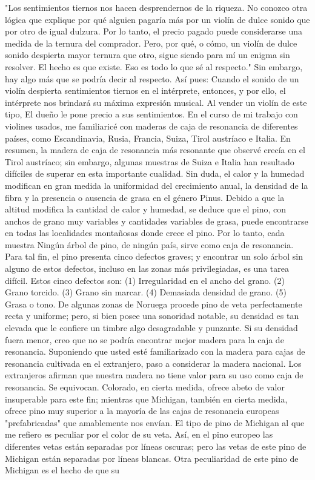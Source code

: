 "Los sentimientos tiernos nos hacen desprendernos de la riqueza. No conozco otra lógica que explique por qué alguien pagaría más por un violín de dulce sonido que por otro de igual dulzura. Por lo tanto, el precio pagado puede considerarse una medida de la ternura del comprador. Pero, por qué, o cómo, un violín de dulce sonido despierta mayor ternura que otro, sigue siendo para mí un enigma sin resolver. El hecho es que existe. Eso es todo lo que sé al respecto."
Sin embargo, hay algo más que se podría decir al respecto. Así pues: Cuando el sonido de un violín despierta sentimientos tiernos en el intérprete, entonces, y por ello, el intérprete nos brindará su máxima expresión musical. Al vender un violín de este tipo,
El dueño le pone precio a sus sentimientos.
En el curso de mi trabajo con violines usados, me familiaricé con maderas de caja de resonancia de diferentes países, como Escandinavia, Rusia, Francia, Suiza, Tirol austríaco e Italia. En resumen, la madera de caja de resonancia más resonante que observé crecía en el Tirol austríaco; sin embargo, algunas muestras de Suiza e Italia han resultado difíciles de superar en esta importante cualidad. Sin duda, el calor y la humedad modifican en gran medida la uniformidad del crecimiento anual, la densidad de la fibra y la presencia o ausencia de grasa en el género Pinus. Debido a que la altitud modifica la cantidad de calor y humedad, se deduce que el pino, con anchos de grano muy variables y cantidades variables de grasa, puede encontrarse en todas las localidades montañosas donde crece el pino. Por lo tanto, cada muestra
Ningún árbol de pino, de ningún país, sirve como caja de resonancia. Para tal fin, el pino presenta cinco defectos graves; y encontrar un solo árbol sin alguno de estos defectos, incluso en las zonas más privilegiadas, es una tarea difícil. Estos cinco defectos son:
(1) Irregularidad en el ancho del grano.
(2) Grano torcido.
(3) Grano sin marcar.
(4) Demasiada densidad de grano.
(5) Grasa o tono.
De algunas zonas de Noruega procede pino de veta perfectamente recta y uniforme; pero, si bien posee una sonoridad notable, su densidad es tan elevada que le confiere un timbre algo desagradable y punzante. Si su densidad fuera menor, creo que no se podría encontrar mejor madera para la caja de resonancia.
Suponiendo que usted esté familiarizado con la madera para cajas de resonancia cultivada en el extranjero, paso a considerar la madera nacional. Los extranjeros afirman que nuestra madera no tiene valor para su uso como caja de resonancia. Se equivocan. Colorado, en cierta medida, ofrece abeto de valor insuperable para este fin; mientras que Michigan, también en cierta medida, ofrece pino muy superior a la mayoría de las cajas de resonancia europeas "prefabricadas" que amablemente nos envían. El tipo de pino de Michigan al que me refiero es peculiar por el color de su veta. Así, en el pino europeo las diferentes vetas están separadas por líneas oscuras; pero las vetas de este pino de Michigan están separadas por líneas blancas. Otra peculiaridad de este pino de Michigan es el hecho de que su

